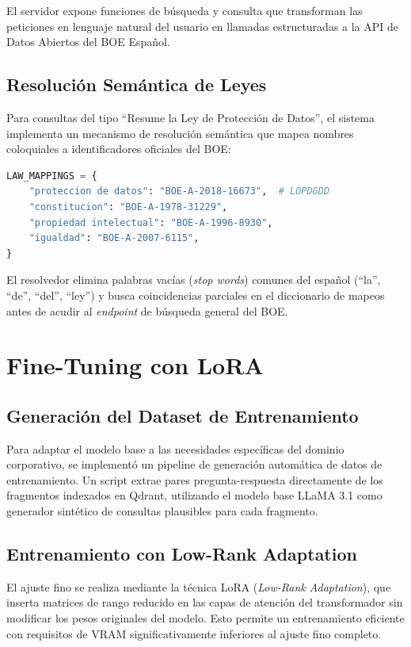 El servidor expone funciones de búsqueda y consulta que transforman las peticiones en lenguaje natural del usuario en llamadas estructuradas a la API de Datos Abiertos del BOE Español.

\subsection{Resolución Semántica de Leyes}
Para consultas del tipo ``Resume la Ley de Protección de Datos'', el sistema implementa un mecanismo de resolución semántica que mapea nombres coloquiales a identificadores oficiales del BOE:

\begin{lstlisting}[language=Python, caption={Mapeo de nombres comunes a identificadores BOE.}]
LAW_MAPPINGS = {
    "proteccion de datos": "BOE-A-2018-16673",  # LOPDGDD
    "constitucion": "BOE-A-1978-31229",
    "propiedad intelectual": "BOE-A-1996-8930",
    "igualdad": "BOE-A-2007-6115",
}
\end{lstlisting}

El resolvedor elimina palabras vacías (\textit{stop words}) comunes del español (``la'', ``de'', ``del'', ``ley'') y busca coincidencias parciales en el diccionario de mapeos antes de acudir al \textit{endpoint} de búsqueda general del BOE.

\section{Fine-Tuning con LoRA}

\subsection{Generación del Dataset de Entrenamiento}
Para adaptar el modelo base a las necesidades específicas del dominio corporativo, se implementó un pipeline de generación automática de datos de entrenamiento. Un script extrae pares pregunta-respuesta directamente de los fragmentos indexados en Qdrant, utilizando el modelo base LLaMA 3.1 como generador sintético de consultas plausibles para cada fragmento.

\subsection{Entrenamiento con Low-Rank Adaptation}
El ajuste fino se realiza mediante la técnica LoRA (\textit{Low-Rank Adaptation}), que inserta matrices de rango reducido en las capas de atención del transformador sin modificar los pesos originales del modelo. Esto permite un entrenamiento eficiente con requisitos de VRAM significativamente inferiores al ajuste fino completo.

